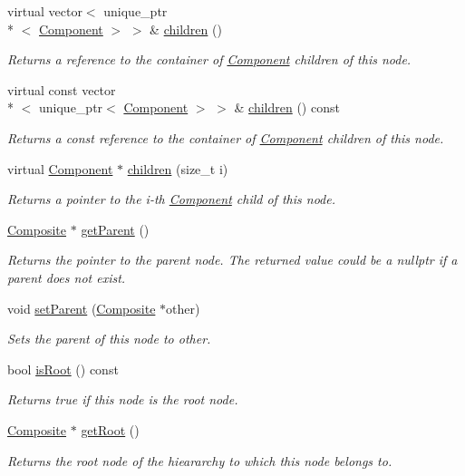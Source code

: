 \begin{DoxyCompactItemize}
virtual vector$<$ unique\+\_\+ptr\\*
$<$ \hyperlink{classComponent}{Component} $>$ $>$ \& \hyperlink{classComposite_adc22f790bd1f78a4a195a61ae60c0965}{children} ()
\begin{DoxyCompactList}\small\item\em Returns a reference to the container of \hyperlink{classComponent}{Component} children of this node. \end{DoxyCompactList}\item 
virtual const vector\\*
$<$ unique\+\_\+ptr$<$ \hyperlink{classComponent}{Component} $>$ $>$ \& \hyperlink{classComposite_a7824aae77c582d72a2e8b403f2636385}{children} () const 
\begin{DoxyCompactList}\small\item\em Returns a const reference to the container of \hyperlink{classComponent}{Component} children of this node. \end{DoxyCompactList}\item 
virtual \hyperlink{classComponent}{Component} $\ast$ \hyperlink{classComposite_af2073a61c00153c28cab3a29926ea060}{children} (size\+\_\+t i)
\begin{DoxyCompactList}\small\item\em Returns a pointer to the i-\/th \hyperlink{classComponent}{Component} child of this node. \end{DoxyCompactList}\item 
\hyperlink{classComposite}{Composite} $\ast$ \hyperlink{classComponent_a4bb9041a7f3854f25f45060e81bb4e4e}{get\+Parent} ()
\begin{DoxyCompactList}\small\item\em Returns the pointer to the parent node. The returned value could be a nullptr if a parent does not exist. \end{DoxyCompactList}\item 
void \hyperlink{classComponent_a9d5b03697a653cda24d5688af1d105f8}{set\+Parent} (\hyperlink{classComposite}{Composite} $\ast$other)
\begin{DoxyCompactList}\small\item\em Sets the parent of this node to other. \end{DoxyCompactList}\item 
bool \hyperlink{classComponent_a4f0bed8144509d6565a30b548fac0fe7}{is\+Root} () const 
\begin{DoxyCompactList}\small\item\em Returns true if this node is the root node. \end{DoxyCompactList}\item 
\hyperlink{classComposite}{Composite} $\ast$ \hyperlink{classComponent_abcb3746cb8b4afcecf437dce40c0c772}{get\+Root} ()
\begin{DoxyCompactList}\small\item\em Returns the root node of the hieararchy to which this node belongs to. \end{DoxyCompactList}\end{DoxyCompactItemize}
